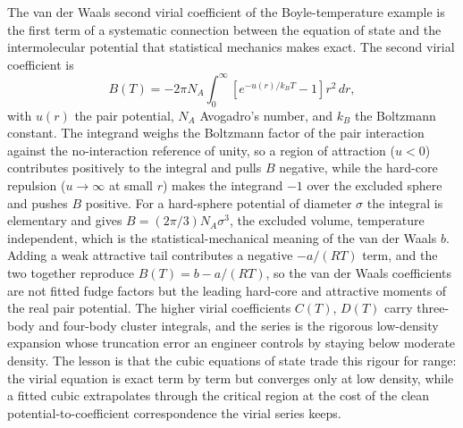 \begin{mastery}
The van der Waals second virial coefficient of the Boyle-temperature example
is the first term of a systematic connection between the equation of state and
the intermolecular potential that statistical mechanics makes exact. The
second virial coefficient is
\[
B(T) = -2\pi N_A \int_0^\infty \left[e^{-u(r)/k_B T} - 1\right] r^2\,dr,
\]
with $u(r)$ the pair potential, $N_A$ Avogadro's number, and $k_B$ the
Boltzmann constant. The integrand weighs the Boltzmann factor of the pair
interaction against the no-interaction reference of unity, so a region of
attraction ($u < 0$) contributes positively to the integral and pulls $B$
negative, while the hard-core repulsion ($u \to \infty$ at small $r$) makes
the integrand $-1$ over the excluded sphere and pushes $B$ positive. For a
hard-sphere potential of diameter $\sigma$ the integral is elementary and
gives $B = (2\pi/3) N_A \sigma^3$, the excluded volume, temperature
independent, which is the statistical-mechanical meaning of the van der Waals
$b$. Adding a weak attractive tail contributes a negative $-a/(RT)$ term, and
the two together reproduce $B(T) = b - a/(RT)$, so the van der Waals
coefficients are not fitted fudge factors but the leading hard-core and
attractive moments of the real pair potential. The higher virial coefficients
$C(T)$, $D(T)$ carry three-body and four-body cluster integrals, and the
series is the rigorous low-density expansion whose truncation error an
engineer controls by staying below moderate density. The lesson is that the
cubic equations of state trade this rigour for range: the virial equation is
exact term by term but converges only at low density, while a fitted cubic
extrapolates through the critical region at the cost of the clean
potential-to-coefficient correspondence the virial series keeps.
\end{mastery}

